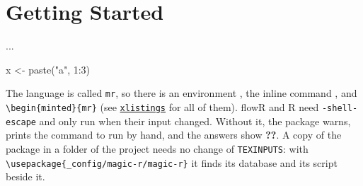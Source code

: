 \documentclass[10pt,DIV=12]{scrartcl}
\makeatletter
\let\TT\texttt
\newcommand\pkg[1]{\href{\ifcsname pkgurl@#1\endcsname\csname pkgurl@#1\endcsname\else https://ctan.org/pkg/#1\fi}{\TT{#1}}}
\newcommand\code{\lstinline[language=lLatex,language addons=latex,basicstyle=\ttfamily,columns=flexible,keepspaces]}
\makeatother
\begin{document}
\section{Getting Started}
\begin{latex}
\usepackage[eval]{magic-r} %
\usepackage{hyperref}      %
...
\begin{mr}
x <- paste("a", 1:3)
\end{mr}
\end{latex}
The language is called \TT{mr}, so there is an environment , the inline command
, and \TT{\textbackslash begin\{minted\}\{mr\}} (see \pkg{xlistings} for all of them).
flowR and R need \TT{-shell-escape} and only run when their input changed. Without it, the package
warns, prints the command to run by hand, and the answers show \textbf{??}.
A copy of the package in a folder of the project needs no change of \TT{TEXINPUTS}: with
\code|\usepackage{_config/magic-r/magic-r}| it finds its database and its script beside it.
\end{document}
